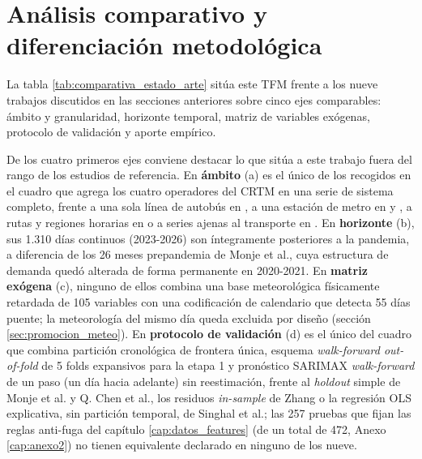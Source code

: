 \section{Análisis comparativo y diferenciación metodológica}\label{sec:comparativa_literatura}

La tabla
\ref{tab:comparativa_estado_arte} sitúa este TFM frente a los nueve trabajos discutidos
en las secciones anteriores sobre cinco ejes comparables: ámbito y granularidad,
horizonte temporal, matriz de variables exógenas, protocolo de validación y aporte
empírico.

\begin{landscape}
  \begin{table}[p]
    \centering
    \footnotesize
    \setlength{\tabcolsep}{4pt}
    \renewcommand{\arraystretch}{0.95}
    \resizebox{\textwidth}{!}{%
    }
    \caption{}
    \label{tab:comparativa_estado_arte}
  \end{table}
\end{landscape}

De los cuatro primeros ejes conviene destacar lo que sitúa a este trabajo fuera del rango
de los estudios de referencia. En \textbf{ámbito} (a) es el único de los recogidos en el
cuadro que agrega los cuatro operadores del CRTM en una serie de sistema completo, frente
a una sola línea de autobús en \textcite{monje2022deep}, a una estación de metro en
\textcite{chen2019emd} y \textcite{cardozo2012spatial}, a rutas y regiones horarias en
\textcite{yazicioglu2025passenger} o a series ajenas al transporte en
\textcite{zhang2003hybrid}. En \textbf{horizonte} (b), sus 1.310 días continuos (2023-2026)
son íntegramente posteriores a la pandemia, a diferencia de los 26 meses prepandemia de
Monje et al., cuya estructura de demanda quedó alterada de forma permanente en 2020-2021.
En \textbf{matriz exógena} (c), ninguno de ellos combina una base meteorológica físicamente
retardada de 105 variables con una codificación de calendario que detecta 55 días puente;
la meteorología del mismo día queda excluida por diseño (sección
\ref{sec:promocion_meteo}). En
\textbf{protocolo de validación} (d) es el único del cuadro que combina partición cronológica de
frontera única, esquema \emph{walk-forward out-of-fold} de 5 folds expansivos para la
etapa 1 y pronóstico SARIMAX \emph{walk-forward} de un paso (un día hacia adelante) sin
reestimación, frente al
\emph{holdout} simple de Monje et al. y Q. Chen et al., los residuos \emph{in-sample} de Zhang o la
regresión OLS explicativa, sin partición temporal, de Singhal et al.; las 257 pruebas
que fijan las reglas anti-fuga del capítulo \ref{cap:datos_features} (de un total de 472,
Anexo \ref{cap:anexo2}) no tienen equivalente declarado en ninguno de los nueve.

